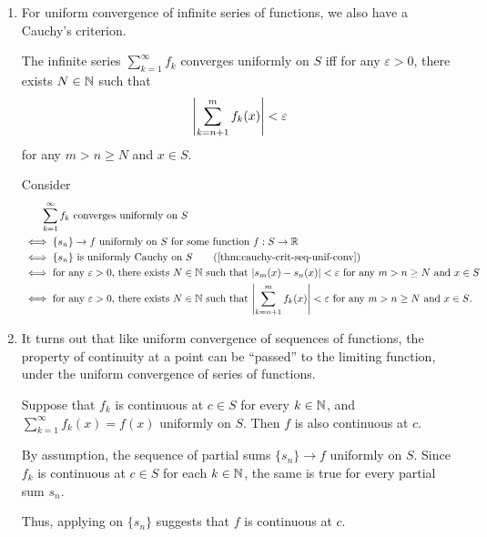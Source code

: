 \begin{enumerate}
\item For uniform convergence of infinite series of functions, we also have a
Cauchy's criterion.

\begin{theorem}
\label{thm:cauchy-crit-series-uniform-conv}
The infinite series \(\sum_{k=1}^{\infty}f_k\) converges uniformly on \(S\) iff
for any \(\varepsilon>0\), there exists \(N\in\mathbb{N}\) such that
\[
\qty|\sum_{k=n+1}^{m}f_k(x)|<\varepsilon
\]
for any \(m>n\ge N\) and \(x\in S\).
\end{theorem}
\begin{pf}
Consider
\begin{align*}
&\qquad\text{\(\sum_{k=1}^{\infty}f_k\) converges uniformly on \(S\)}\\
&\iff \text{\(\{s_n\}\to f\) uniformly on \(S\) for some function \(f:S\to\R\)} \\
&\iff \text{\(\{s_n\}\) is uniformly Cauchy on \(S\)} \qquad\text{(\Cref{thm:cauchy-crit-seq-unif-conv})} \\
&\iff \text{for any \(\varepsilon>0\), there exists \(N\in\N\) such that
\(|s_m(x)-s_n(x)|<\varepsilon\) for any \(m>n\ge N\) and \(x\in S\)} \\
&\iff \text{for any \(\varepsilon>0\), there exists \(N\in\N\) such that
\(\qty|\sum_{k=n+1}^{m}f_k(x)|<\varepsilon\) for any \(m>n\ge N\) and \(x\in
S\)}.
\end{align*}
\end{pf}

\item It turns out that like uniform convergence of sequences of functions, the
property of continuity at a point can be ``passed'' to the limiting function,
under the uniform convergence of series of functions.

\begin{proposition}
\label{prp:unif-conv-series-cts}
Suppose that \(f_k\) is continuous at \(c\in S\) for every \(k\in\mathbb{N}\), and
\(\sum_{k=1}^{\infty}f_k(x)=f(x)\) uniformly on \(S\). Then \(f\) is also
continuous at \(c\).
\end{proposition}
\begin{pf}
By assumption, the sequence of partial sums \(\{s_n\}\to f\) uniformly on
\(S\). Since \(f_k\) is continuous at \(c\in S\) for each \(k\in\mathbb{N}\), the same
is true for every partial sum \(s_n\).

Thus, applying  on \(\{s_n\}\) suggests that \(f\)
is continuous at \(c\).
\end{pf}


\end{enumerate}

